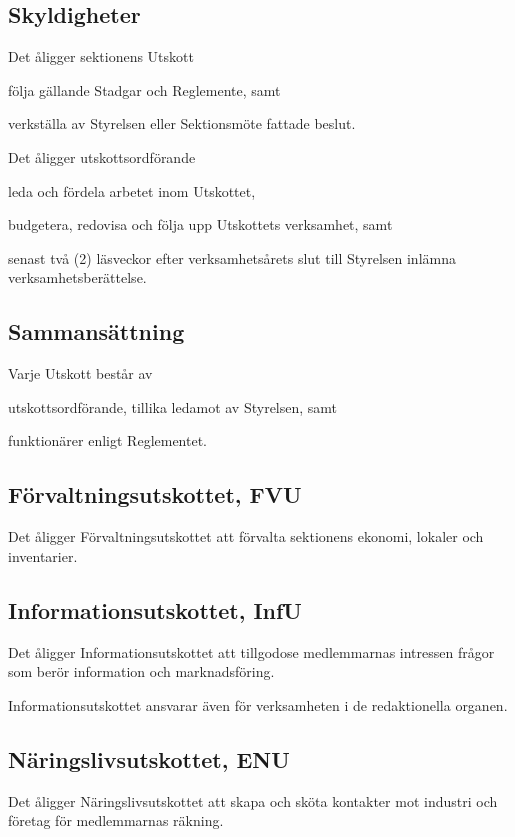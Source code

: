 \documentclass[10pt]{article}
\begin{document}
    \subsection{Skyldigheter}
    Det åligger sektionens Utskott
    \begin{attlist}
    \item följa gällande Stadgar och Reglemente, samt
    \item verkställa av Styrelsen eller Sektionsmöte fattade beslut.
    \end{attlist}
    Det åligger utskottsordförande
    \begin{attlist}
    \item leda och fördela arbetet inom Utskottet,
    \item budgetera, redovisa och följa upp Utskottets verksamhet, samt
    \item senast två (2) läsveckor efter verksamhetsårets slut till Styrelsen
        inlämna verksamhetsberättelse.
    \end{attlist}
    
    \subsection{Sammansättning}
    Varje Utskott består av
    \begin{alphlist}
    \item utskottsordförande, tillika ledamot av Styrelsen, samt
    \item funktionärer enligt Reglementet.
    \end{alphlist}
    
    \subsection{Förvaltningsutskottet, FVU}
    Det åligger Förvaltningsutskottet att förvalta sektionens ekonomi,
    lokaler och inventarier.
    
    \subsection{Informationsutskottet, InfU}
    Det åligger Informationsutskottet att tillgodose medlemmarnas
    intressen frågor som berör information och marknadsföring.
    
    Informationsutskottet ansvarar även för verksamheten i de redaktionella
    organen.
    
    \subsection{Näringslivsutskottet, ENU}
    Det åligger Näringslivsutskottet att skapa och
    sköta kontakter mot industri och företag för medlemmarnas räkning.
    
\end{document}
